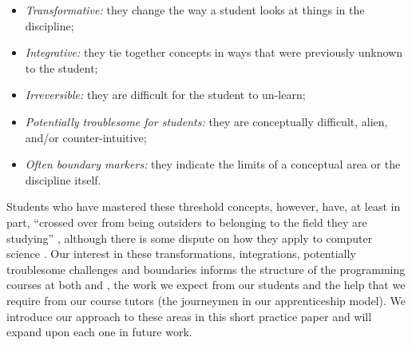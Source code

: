 \documentclass[conference,compsoc]{IEEEtran}
\begin{document}
\begin{itemize}
	\item	{\emph{Transformative:}} they change the way a student looks at things in the discipline;
	\item	{\emph{Integrative:}} they tie together concepts in ways that were previously unknown to the student;
	\item	{\emph{Irreversible:}} they are difficult for the student to un-learn;
	\item	{\emph{Potentially troublesome for students:}} they are conceptually difficult, alien, and/or counter-intuitive;
	\item	{\emph{Often boundary markers:}} they indicate the limits of a conceptual area or the discipline itself.
\end{itemize}

Students who have mastered these threshold concepts, however, have, at
least in part, ``crossed over from being outsiders to belonging to the
field they are studying'' \cite{Eckerdal}, although there is some
dispute on how they apply to computer science \cite{Boustedt}.  Our
interest in these transformations, integrations, potentially
troublesome challenges and boundaries informs the structure of the
programming courses at both \Bath{} and \Cardiff, the work we expect
from our students and the help that we require from our course tutors
(the journeymen in our apprenticeship model). We introduce our
approach to these areas in this short practice paper and will expand
upon each one in future work.
\end{document}
